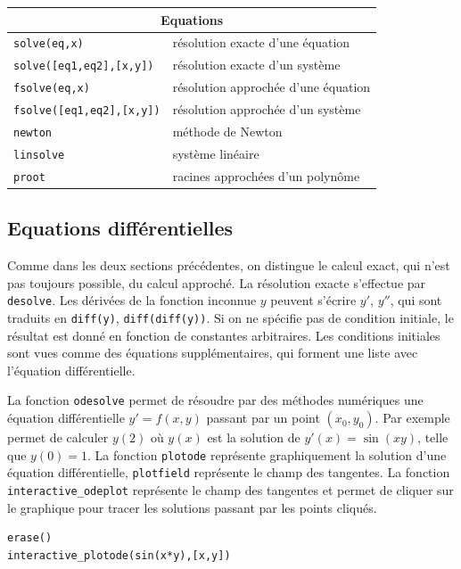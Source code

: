 \documentclass{article}
\begin{document}
\begin{giacjshere}
\begin{center}
\begin{tabular}{|ll|}
\hline
\multicolumn{2}{|c|}{\bf Equations}\\
\hline\hline
\verb|solve(eq,x)| &r\'esolution exacte d'une \'equation\\
\verb|solve([eq1,eq2],[x,y])| &r\'esolution exacte d'un syst\`eme\\
\verb|fsolve(eq,x)| &r\'esolution approch\'ee d'une \'equation\\
\verb|fsolve([eq1,eq2],[x,y])| &r\'esolution approch\'ee d'un syst\`eme\\
\verb|newton| & m\'ethode de Newton\\
\verb|linsolve| & syst\`eme lin\'eaire\\
\verb|proot| & racines approch\'ees d'un polyn\^ome\\
\hline
\end{tabular}
\end{center}
%
\subsection{Equations diff\'erentielles}
%
Comme dans les deux sections pr\'ec\'edentes, on distingue le
calcul exact, qui n'est pas toujours possible, du calcul
approch\'e. La r\'esolution exacte s'effectue par \verb|desolve|. 
Les d\'eriv\'ees de la fonction inconnue $y$ peuvent s'\'ecrire $y'$,
$y''$, qui sont traduits en \verb|diff(y)|, \verb|diff(diff(y))|.
Si on ne sp\'ecifie pas de condition initiale, le r\'esultat est donn\'e
en fonction de constantes arbitraires.
Les conditions initiales sont vues comme des \'equations
suppl\'ementaires, qui forment une liste avec l'\'equation 
diff\'erentielle.

La fonction \verb|odesolve| permet de r\'esoudre par des m\'ethodes
num\'eriques une \'equation diff\'erentielle $y'=f(x,y)$ passant par
un point $(x_0,y_0)$. Par exemple
permet de calculer $y(2)$ o\`u $y(x)$ est la solution de $y'(x)=\sin(xy)$,
telle que $y(0)=1$.
La fonction \verb|plotode| repr\'esente graphiquement
la solution d'une \'equation diff\'erentielle,
\verb|plotfield| repr\'esente le champ
des tangentes. La fonction 
\verb|interactive_odeplot| repr\'esente le champ
des tangentes et permet de cliquer sur le graphique pour tracer
les solutions passant par les points cliqu\'es.
\begin{verbatim}
erase()
interactive_plotode(sin(x*y),[x,y])
\end{verbatim}


\end{giacjshere}
\end{document}
